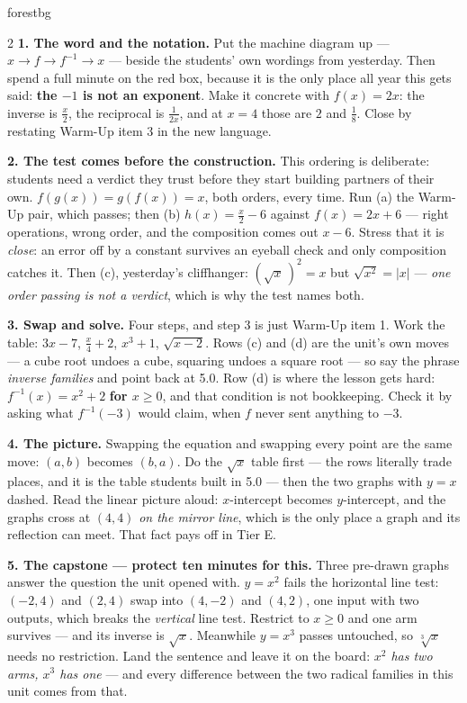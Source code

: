 \documentclass[10pt]{article}
\begin{document}
\begin{skillbox}[Lesson]{forestbg}
\begin{multicols}{2}
\textbf{1. The word and the notation.} Put the machine diagram up --- $x\to f\to f^{-1}\to x$ ---
beside the students' own wordings from yesterday. Then spend a full minute on the red box, because
it is the only place all year this gets said: \textbf{the $-1$ is not an exponent}. Make it concrete
with $f(x)=2x$: the inverse is $\frac{x}{2}$, the reciprocal is $\frac{1}{2x}$, and at $x=4$ those
are $2$ and $\frac18$. Close by restating Warm-Up item 3 in the new language.

\textbf{2. The test comes before the construction.} This ordering is deliberate: students need a
verdict they trust before they start building partners of their own. $f(g(x))=g(f(x))=x$, both
orders, every time. Run (a) the Warm-Up pair, which passes; then (b) $h(x)=\frac{x}{2}-6$ against
$f(x)=2x+6$ --- right operations, wrong order, and the composition comes out $x-6$. Stress that it
is \emph{close}: an error off by a constant survives an eyeball check and only composition catches
it. Then (c), yesterday's cliffhanger: $\left(\sqrt{x}\,\right)^{2}=x$ but $\sqrt{x^{2}}=|x|$ ---
\emph{one order passing is not a verdict}, which is why the test names both.

\textbf{3. Swap and solve.} Four steps, and step 3 is just Warm-Up item 1. Work the table: $3x-7$,
$\frac{x}{4}+2$, $x^{3}+1$, $\sqrt{x-2}$. Rows (c) and (d) are the unit's own moves --- a cube root
undoes a cube, squaring undoes a square root --- so say the phrase \emph{inverse families} and point
back at 5.0. Row (d) is where the lesson gets hard: $f^{-1}(x)=x^{2}+2$ \textbf{for $x\ge0$}, and
that condition is not bookkeeping. Check it by asking what $f^{-1}(-3)$ would claim, when $f$ never
sent anything to $-3$.

\columnbreak

\textbf{4. The picture.} Swapping the equation and swapping every point are the same move: $(a,b)$
becomes $(b,a)$. Do the $\sqrt{x}$ table first --- the rows literally trade places, and it is the
table students built in 5.0 --- then the two graphs with $y=x$ dashed. Read the linear picture
aloud: $x$-intercept becomes $y$-intercept, and the graphs cross at $(4,4)$ \emph{on the mirror
line}, which is the only place a graph and its reflection can meet. That fact pays off in Tier E.

\textbf{5. The capstone --- protect ten minutes for this.} Three pre-drawn graphs answer the
question the unit opened with. $y=x^{2}$ fails the horizontal line test: $(-2,4)$ and $(2,4)$ swap
into $(4,-2)$ and $(4,2)$, one input with two outputs, which breaks the \emph{vertical} line test.
Restrict to $x\ge0$ and one arm survives --- and its inverse is $\sqrt{x}$. Meanwhile $y=x^{3}$
passes untouched, so $\sqrt[3]{x}$ needs no restriction. Land the sentence and leave it on the
board: \emph{$x^{2}$ has two arms, $x^{3}$ has one} --- and every difference between the two radical
families in this unit comes from that.


\end{multicols}
\end{skillbox}
\end{document}
